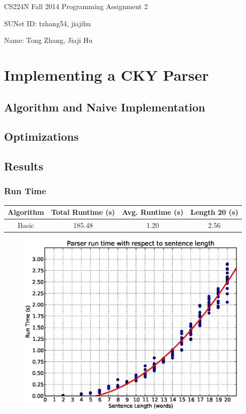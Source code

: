 \documentclass[12pt]{article}
\begin{document}
\begin{center}
{\Large CS224N Fall 2014 Programming Assignment 2}
\vspace{12pt}

SUNet ID: tzhang54, jiajihu

Name: Tong Zhang, Jiaji Hu
\vspace{12pt}
\end{center}

\section{Implementing a CKY Parser}
\subsection{Algorithm and Naive Implementation}

\subsection{Optimizations}

\subsection{Results}
\subsubsection{Run Time}
\begin{center}
\begin{tabular}{|c|c|c|c|}
\hline
Algorithm & Total Runtime (s) & Avg. Runtime (s) & Length 20 (s)\\\hline
Basic & 185.48 & 1.20 & 2.56 \\\hline

\end{tabular}
\end{center}
\begin{figure}[H]
\centering
\includegraphics[width=0.6\linewidth]{./stats/runtime}
\end{figure}
\end{document}

